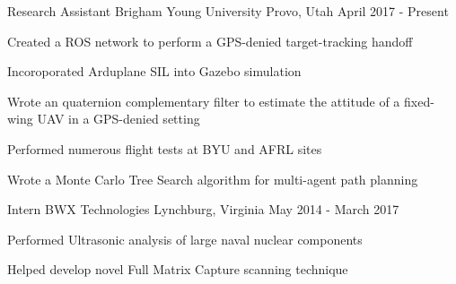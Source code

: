

\begin{cventries}

  \cventry
    {Research Assistant} %
    {Brigham Young University} %
    {Provo, Utah} %
    {April 2017 - Present} %
    {
      \begin{cvitems} %
      \item  {Created a ROS network to perform a GPS-denied target-tracking handoff}
      \item  {Incoroporated Arduplane SIL into Gazebo simulation}
      \item  {Wrote an quaternion complementary filter to estimate the attitude of a fixed-wing UAV in a GPS-denied setting}
      \item  {Performed numerous flight tests at BYU and AFRL sites}
      \item  {Wrote a Monte Carlo Tree Search algorithm for multi-agent path planning}
      \end{cvitems}
    }
  \cventry
    {Intern} %
    {BWX Technologies} %
    {Lynchburg, Virginia} %
    {May 2014 - March 2017} %
    {
      \begin{cvitems} %
      \item  {Performed Ultrasonic analysis of large naval nuclear components}
      \item  {Helped develop novel Full Matrix Capture scanning technique}
      \end{cvitems}
    }

\end{cventries}

